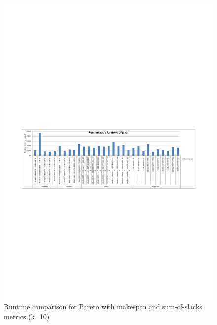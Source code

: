 \documentclass[]{article}
\begin{document}
\begin{figure}
\centering
\includegraphics[width=\linewidth]{subset-benchmark-runtime.pdf}
\caption{Runtime comparison for Pareto with makespan and sum-of-slacks metrics (k=10)}
\label{fig:subset-benchmark-runtime}
\end{figure}
\end{document}
